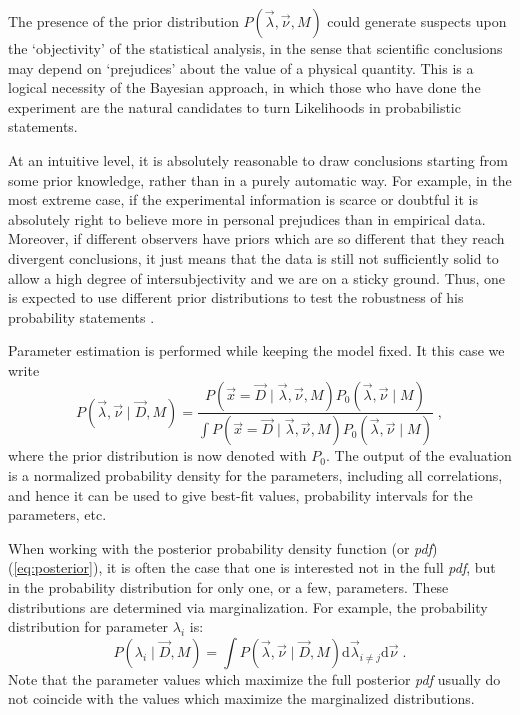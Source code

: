  The presence of the prior distribution $P(\vec{\lambda},\vec{\nu},M)$ could generate suspects upon the `objectivity' of the statistical analysis, in the sense that scientific conclusions may depend on `prejudices' about the value of a physical quantity. This is a logical necessity of the Bayesian approach, in which those who have done the experiment are the natural candidates to turn Likelihoods in probabilistic statements.

At an intuitive level, it is absolutely reasonable to draw conclusions starting from some prior knowledge, rather than in a purely automatic way. For example, in the most extreme case, if the experimental information is scarce or doubtful it is absolutely right to believe more in personal prejudices than in empirical data. Moreover, if different observers have priors which are so different that they reach divergent conclusions, it just means that the data is still not sufficiently solid to allow a high degree of intersubjectivity and we are on a sticky ground. Thus, one is expected to use different prior distributions to test the robustness of his probability statements \cite{bayesbook}.

 Parameter estimation is performed while keeping the model fixed. It this case we write
\begin{equation}P(\vec{\lambda},\vec{\nu}\mid\vec{D},M)=\frac{P(\vec{x}=\vec{D}\mid\vec{\lambda},\vec{\nu},M)P_0(\vec{\lambda},\vec{\nu}\mid M)}{\int P(\vec{x}=\vec{D}\mid\vec{\lambda},\vec{\nu},M)P_0(\vec{\lambda},\vec{\nu}\mid M)}\;,\label{eq:posterior}\end{equation}
where the prior distribution is now denoted with $P_0$. The output of the evaluation is a normalized probability density for the parameters, including all correlations, and hence it can be used to give best-fit values, probability intervals for the parameters, etc.

When working with the posterior probability density function (or \emph{pdf}) (\ref{eq:posterior}), it is often the case that one is interested not in the full \emph{pdf}, but in the probability distribution for only one, or a few, parameters. These distributions are determined via marginalization. For example, the probability distribution for parameter $\lambda_i$ is:
\begin{equation}P(\lambda_i\mid\vec{D},M)=\int P(\vec{\lambda},\vec{\nu}\mid\vec{D},M)\text{d}\vec{\lambda}_{i\neq j}\text{d}\vec{\nu}\;.\end{equation}
Note that the parameter values which maximize the full posterior \emph{pdf} usually do not coincide with the values which maximize the marginalized distributions.

